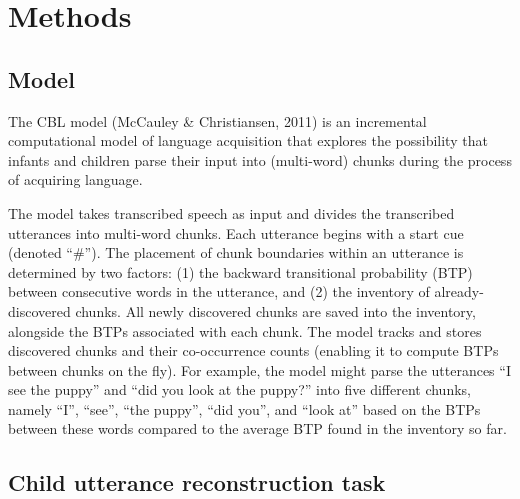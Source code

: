 \documentclass[
  english,
  man,floatsintext]{apa6}
\begin{document}
\hypertarget{methods}{%
\section{Methods}\label{methods}}

\hypertarget{model}{%
\subsection{Model}\label{model}}

The CBL model (McCauley \& Christiansen, 2011) is an incremental computational model of language acquisition that explores the possibility that infants and children parse their input into (multi-word) chunks during the process of acquiring language.

The model takes transcribed speech as input and divides the transcribed utterances into multi-word chunks. Each utterance begins with a start cue (denoted \enquote{\#}). The placement of chunk boundaries within an utterance is determined by two factors: (1) the backward transitional probability (BTP) between consecutive words in the utterance, and (2) the inventory of already-discovered chunks. All newly discovered chunks are saved into the inventory, alongside the BTPs associated with each chunk. The model tracks and stores discovered chunks and their co-occurrence counts (enabling it to compute BTPs between chunks on the fly). For example, the model might parse the utterances \enquote{I see the puppy} and \enquote{did you look at the puppy?} into five different chunks, namely \enquote{I}, \enquote{see}, \enquote{the puppy}, \enquote{did you}, and \enquote{look at} based on the BTPs between these words compared to the average BTP found in the inventory so far.

\hypertarget{child-utterance-reconstruction-task}{%
\subsection{Child utterance reconstruction task}\label{child-utterance-reconstruction-task}}
\end{document}
